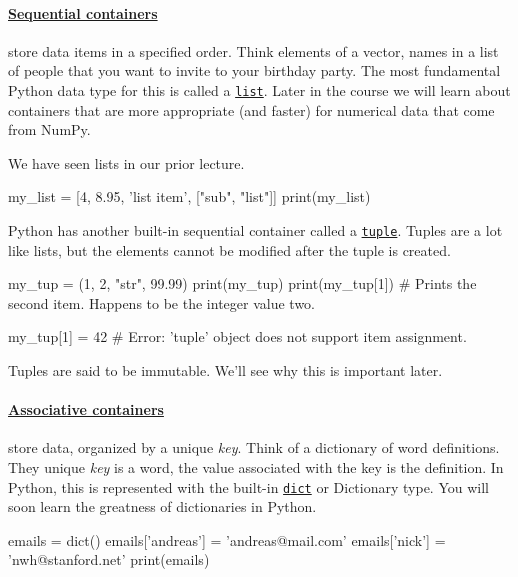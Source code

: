 \documentclass[12pt,letterpaper,twoside]{article}
\begin{document}
\paragraph{\href{https://en.wikipedia.org/wiki/List_(abstract_data_type)}{Sequential containers}} 
store data items in a specified order.
Think elements of a vector, names in a list of people that you want to
invite to your birthday party. The most fundamental Python data type for
this is called a \href{https://docs.python.org/3/tutorial/datastructures.html#more-on-lists}{\texttt{list}}. 
Later in the course we will learn about
containers that are more appropriate (and faster) for numerical data
that come from NumPy.

We have seen lists in our prior lecture.
\begin{python}
my_list = [4, 8.95, 'list item', ["sub", "list"]]
print(my_list)
\end{python}

Python has another built-in sequential container called a
\href{https://docs.python.org/3/tutorial/datastructures.html#tuples-and-sequences}{\texttt{tuple}}. 
Tuples are a lot like lists, but the elements cannot be modified after the tuple is created.

\begin{python}
my_tup = (1, 2, "str", 99.99)
print(my_tup)
print(my_tup[1]) # Prints the second item. Happens to be the integer value two.

my_tup[1] = 42   # Error: 'tuple' object does not support item assignment.
\end{python}

Tuples are said to be immutable. We'll see why this is important later.

\paragraph{\href{https://en.wikipedia.org/wiki/Associative_array}{Associative containers}}
store data, organized by a unique
\emph{key}. Think of a dictionary of word definitions. They unique
\emph{key} is a word, the value associated with the key is the
definition. In Python, this is represented with the built-in
\href{https://docs.python.org/3/tutorial/datastructures.html#dictionaries}{\texttt{dict}} 
or Dictionary type. You will soon learn the greatness of
dictionaries in Python.

\begin{python}
emails = dict()
emails['andreas'] = 'andreas@mail.com'
emails['nick'] = 'nwh@stanford.net'
print(emails)
\end{python}
\end{document}
